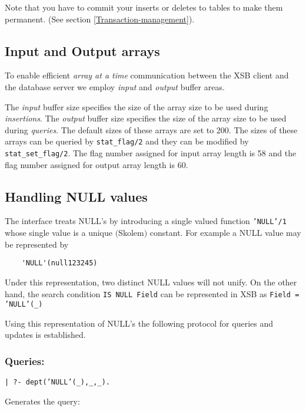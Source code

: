 Note that you have to commit your inserts or deletes to tables to make
them permanent.  (See section \ref{Transaction-management}).

\subsection{Input and Output arrays}\label{Array-sizes}

To enable efficient {\it array at a time} communication between the XSB client
and the database server we employ {\it input} and  {\it output} buffer areas.

The {\it input} buffer size specifies the size of the array size to be used
during {\it insertions}. The {\it output} buffer size specifies the size of the
array size to be used during {\it queries}. The default sizes of these arrays
are set to 200. The sizes of these arrays can be queried by {\tt stat\_flag/2}
and they can be modified by {\tt stat\_set\_flag/2}. The flag number assigned
for input array length is 58 and  the flag number assigned for output array 
length is 60.

\subsection{Handling NULL values}\label{NULL-values}


The interface treats NULL's by introducing a single valued function
{\tt 'NULL'/1} whose single value is a unique $($Skolem$)$ constant.
For example a NULL value may be represented by 
\begin{verbatim}
	'NULL'(null123245) 
\end{verbatim} 
Under this representation, two distinct NULL values will not unify.
On the other hand, the search condition {\tt IS NULL Field} can be
represented in XSB as {\tt Field = 'NULL'(\_)}

Using this representation of NULL's the following protocol for queries
and updates is established.

\subsubsection{Queries:}

\begin{center}

{\tt | ?- dept('NULL'(\_),\_,\_).}
\end{center}

Generates the query: 



